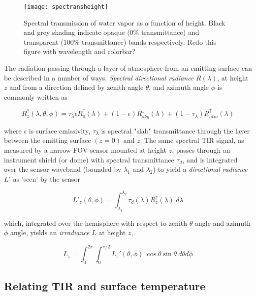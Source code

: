 \begin{figure}[H]
	\texttt{[image: spectransheight]}
	\caption{Spectral transmission of water vapor as a function of height. Black and grey shading indicate opaque (0\% transmittance) and transparent (100\% transmittance) bands respectively. Redo this figure with wavelength and colorbar?}
	\label{spectransheight}
\end{figure}

The radiation passing through a layer of atmosphere from an emitting surface can be described in a number of ways. \textit{Spectral directional radiance} $ R (\lambda)$, at height $ z $ and from a direction defined by zenith angle \(\theta\), and azimuth angle \(\phi\) is commonly written as

\begin{equation}
R^\uparrow_z (\lambda, \theta, \phi) = \tau_\lambda \epsilon R^\uparrow_0(\lambda) + (1-\epsilon) R^\downarrow_{sky} (\lambda) + (1-\tau_\lambda) R^\uparrow_{atm}(\lambda)
\end{equation}

\noindent where \(\epsilon\) is surface emissivity, \(\tau\)\textsubscript{\( \lambda \)} is spectral "slab" transmittance through the layer between the emitting surface $( z  = 0) $ and $ z $. The same spectral TIR signal, as measured by a narrow-FOV sensor mounted at height $ z $, passes through an instrument shield (or dome) with spectral transmittance \(\tau_d\), and is integrated over the sensor waveband (bounded by \(\lambda_1\) and \(\lambda_2\)) to yield a \textit{directional radiance} $L'$ as 'seen' by the sensor

\begin{equation}
L'_z (\theta, \phi) = \int_{\lambda_1}^{\lambda_2} \tau_d(\lambda) R^\uparrow_z(\lambda) ~ d\lambda
\end{equation}

\noindent which, integrated over the hemisphere with respect to zenith \(\theta\) angle and azimuth \(\phi\) angle, yields an \textit{irradiance} $ L $ at height $ z $,

\begin{equation}
L_z = \int_{0}^{2\pi} \int_{0}^{\pi/2} L_z'(\theta, \phi) ~ \cos\theta \sin\theta ~ d\theta d\phi
\end{equation}

\subsection{Relating TIR and surface temperature}

